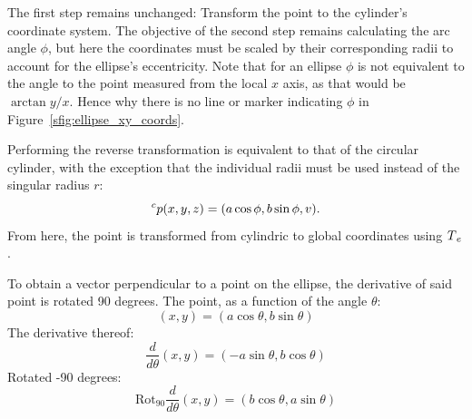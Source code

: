 The first step remains unchanged: Transform the point to the cylinder's coordinate system.
The objective of the second step remains calculating the arc angle $\phi$, but here the coordinates must be scaled by their corresponding radii to account for the ellipse's eccentricity.
Note that for an ellipse $\phi$ is not equivalent to the angle to the point measured from the local $x$ axis, as that would be $\arctan y/x$.
Hence why there is no line or marker indicating $\phi$ in Figure~\ref{sfig:ellipse_xy_coords}.

Performing the reverse transformation is equivalent to that of the circular cylinder, with the exception that the individual radii must be used instead of the singular radius $r$:
\begin{equation*}
	\prescript{c}{}p(x,y,z) = (a \cos \phi, b \sin \phi, v).
\end{equation*}
From here, the point is transformed from cylindric to global coordinates using $\prescript{}{}T_e$.

\iffalse
To obtain a vector perpendicular to a point on the ellipse, the derivative of said point is rotated 90 degrees.
The point, as a function of the angle $\theta$:
\begin{equation}
	(x,y) = (a\cos\theta, b\sin\theta)
\end{equation}
The derivative thereof:
\begin{equation}
	\frac{d}{d\theta}(x,y) = (-a\sin\theta, b\cos\theta)
\end{equation}
Rotated -90 degrees:
\begin{equation}
	\text{Rot}_{90}\frac{d}{d\theta}(x,y) = (b\cos\theta, a\sin\theta)
\end{equation}

